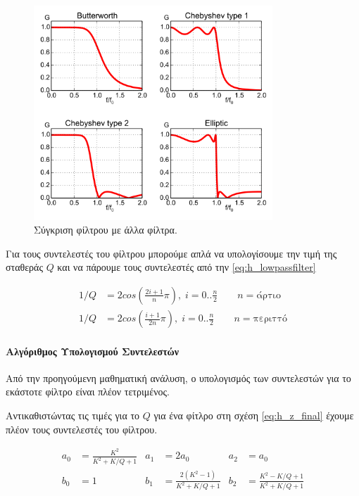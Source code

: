 \documentclass{article}
\begin{document}
\begin{figure}[htpb]
    \centering
    \includegraphics[width=0.8\textwidth]{./assets/comparison_filters.png}
    \caption{Σύγκριση φίλτρου  με άλλα φίλτρα.}
    \label{fig:}
\end{figure}

Για τους συντελεστές του φίλτρου  μπορούμε απλά να υπολογίσουμε την τιμή 
της σταθεράς $Q$ και να πάρουμε τους συντελεστές από την \cref{eq:h_lowpassfilter} \cite{OpenheimAlan, JuceDocumentation}

\begin{align}
    1/Q &= {2cos(\frac{2i + 1}{n}\pi)}, \; i = 0..\frac{n}{2} \qquad n = {\text{άρτιο}} \\ 
    1/Q &= {2cos(\frac{i + 1}{2n}\pi)}, \; i = 0..\frac{n}{2} \qquad n = {\text{περιττό}}
\end{align}

\paragraph{Αλγόριθμος Υπολογισμού Συντελεστών}

Από την προηγούμενη μαθηματική ανάλυση, ο υπολογισμός των συντελεστών για το εκάστοτε φίλτρο είναι πλέον 
τετριμένος. 

Αντικαθιστώντας τις τιμές για το $Q$ για ένα φίτλρο  στη σχέση \ref{eq:h_z_final}
έχουμε πλέον τους συντελεστές του φίλτρου. 


\begin{align}
    a_0 &= \frac{K^2}{K^2 + K/Q +1} & a_1 &= 2a_0 & a_2 &= a_0 \\
    b_0 &= 1 & b_1 &= \frac{2(K^2 - 1)}{K^2 + K/Q + 1} & b_2 &= \frac{K^2 - K/Q + 1}{K^2 + K/Q + 1}
\end{align}
\end{document}
